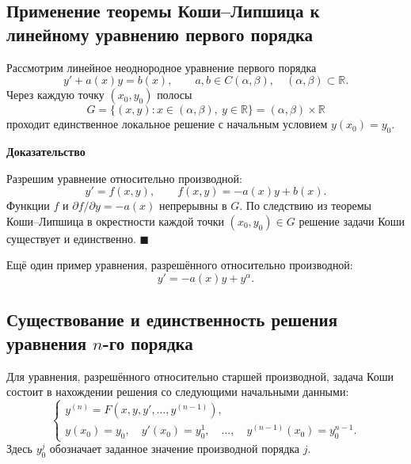 \documentclass[12pt,a4paper]{article}
\numberwithin{equation}{section}
\newcommand{\R}{\mathbb{R}}
\renewenvironment{proof}[1][Доказательство]{\begin{center}\textbf{#1}\end{center}}{\hfill$\blacksquare$\par}
\DeclareRobustCommand{\examtag}[1]{\space{\normalfont\small\color{HSEgray}(#1)}}
\begin{document}
\subsection[Линейное уравнение первого порядка\examtag{вопрос~7}]{Применение теоремы Коши--Липшица к линейному уравнению первого порядка\examtag{вопрос~7}}

Рассмотрим линейное неоднородное уравнение первого порядка
\[
 y'+a(x)y=b(x),\qquad a,b\in C(\alpha,\beta),\quad (\alpha,\beta)\subset\R.
\]
Через каждую точку \((x_0,y_0)\) полосы
\[
 G=\{(x,y):x\in(\alpha,\beta),\ y\in\R\}=(\alpha,\beta)\times\R
\]
проходит единственное локальное решение с начальным условием \(y(x_0)=y_0\).

\begin{center}
\end{center}

\begin{proof}
Разрешим уравнение относительно производной:
\[
 y'=f(x,y),\qquad f(x,y)=-a(x)y+b(x).
\]
Функции \(f\) и \(\partial f/\partial y=-a(x)\) непрерывны в \(G\).
По следствию из теоремы Коши--Липшица в окрестности каждой точки
\((x_0,y_0)\in G\) решение задачи Коши существует и единственно.
\end{proof}

Ещё один пример уравнения, разрешённого относительно производной:
\[
 y'=-a(x)y+y^\alpha.
\]

\subsection[Задача Коши для уравнения \texorpdfstring{\(n\)}{n}-го порядка\examtag{вопрос~11}]{Существование и единственность решения уравнения \texorpdfstring{\(n\)}{n}-го порядка\examtag{вопрос~11}}

Для уравнения, разрешённого относительно старшей производной, задача
Коши состоит в нахождении решения со следующими начальными данными:
\[
 \begin{cases}
 y^{(n)}=F(x,y,y',\ldots,y^{(n-1)}),\\
 y(x_0)=y_0,\quad y'(x_0)=y_0^1,\quad\ldots,\quad
 y^{(n-1)}(x_0)=y_0^{n-1}.
 \end{cases}
\]
Здесь \(y_0^j\) обозначает заданное значение производной порядка \(j\).
\end{document}
